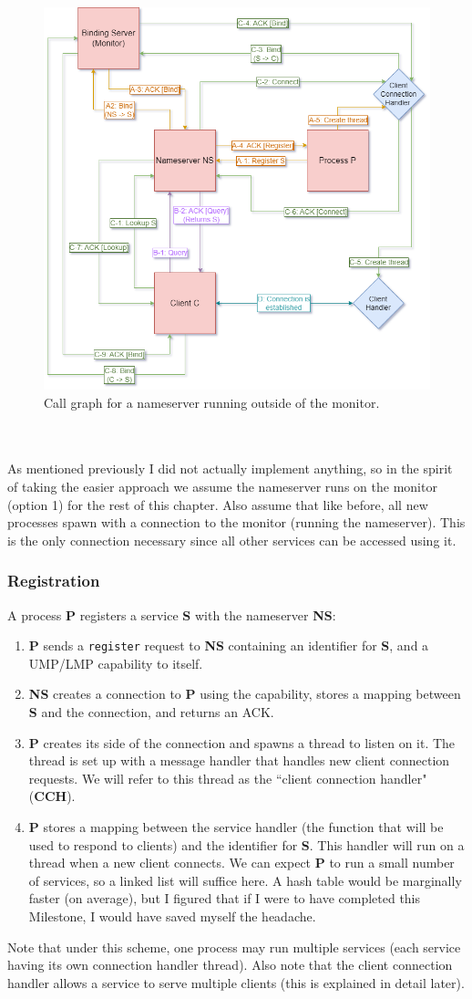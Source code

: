 \begin{figure}[ht]
    \centering
    \includegraphics[width=0.5\columnwidth]{images/bindingserver.png}
    \caption{Call graph for a nameserver running outside of the monitor.}
    \label{figure:bindingserver}
\end{figure}
\\\\
As mentioned previously I did not actually implement anything, so in the spirit of taking the easier approach we assume the nameserver runs on the monitor (option 1) for the rest of this chapter. Also assume that like before, all new processes spawn with a connection to the monitor (running the nameserver). This is the only connection necessary since all other services can be accessed using it.

\subsubsection{Registration}
A process \textbf{P} registers a service \textbf{S} with the nameserver \textbf{NS}:
\begin{enumerate}[itemsep=0pt]
    \item \textbf{P} sends a \texttt{register} request to \textbf{NS} containing an identifier for \textbf{S}, and a UMP/LMP capability to itself.
    \item \textbf{NS} creates a connection to \textbf{P} using the capability, stores a mapping between \textbf{S} and the connection, and returns an ACK.
    \item \textbf{P} creates its side of the connection and spawns a thread to listen on it. The thread is set up with a message handler that handles new client connection requests. We will refer to this thread as the ``client connection handler" (\textbf{CCH}).
    \item \textbf{P} stores a mapping between the service handler (the function that will be used to respond to clients) and the identifier for \textbf{S}. This handler will run on a thread when a new client connects. We can expect \textbf{P} to run a small number of services, so a linked list will suffice here. A hash table would be marginally faster (on average), but I figured that if I were to have completed this Milestone, I would have saved myself the headache.
\end{enumerate}
Note that under this scheme, one process may run multiple services (each service having its own connection handler thread). Also note that the client connection handler allows a service to serve multiple clients (this is explained in detail later).

